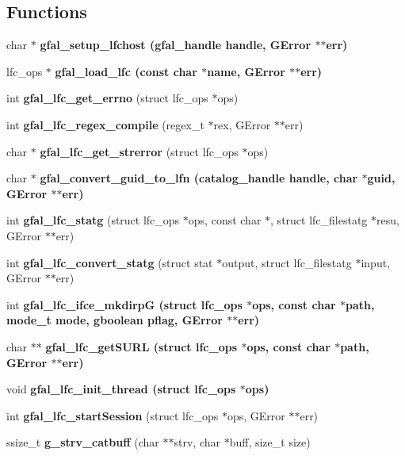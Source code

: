 \subsection*{Functions}
\begin{CompactItemize}
\item 
char $\ast$ \bf{gfal\_\-setup\_\-lfchost} (gfal\_\-handle handle, GError $\ast$$\ast$err)
\item 
lfc\_\-ops $\ast$ \bf{gfal\_\-load\_\-lfc} (const char $\ast$name, GError $\ast$$\ast$err)
\item 
int \textbf{gfal\_\-lfc\_\-get\_\-errno} (struct lfc\_\-ops $\ast$ops)\label{lfc__ifce__ng_8h_caa53981228e722b2175cfd7b4ca051c}

\item 
int \textbf{gfal\_\-lfc\_\-regex\_\-compile} (regex\_\-t $\ast$rex, GError $\ast$$\ast$err)\label{lfc__ifce__ng_8h_4ecadc4bf36b4b23af7beb949f6190be}

\item 
char $\ast$ \textbf{gfal\_\-lfc\_\-get\_\-strerror} (struct lfc\_\-ops $\ast$ops)\label{lfc__ifce__ng_8h_58172b62403dfd7a7b742548f074cd44}

\item 
char $\ast$ \bf{gfal\_\-convert\_\-guid\_\-to\_\-lfn} (catalog\_\-handle handle, char $\ast$guid, GError $\ast$$\ast$err)
\item 
int \textbf{gfal\_\-lfc\_\-statg} (struct lfc\_\-ops $\ast$ops, const char $\ast$, struct lfc\_\-filestatg $\ast$resu, GError $\ast$$\ast$err)\label{lfc__ifce__ng_8h_afccde3c16147263025698f5481635cf}

\item 
int \textbf{gfal\_\-lfc\_\-convert\_\-statg} (struct stat $\ast$output, struct lfc\_\-filestatg $\ast$input, GError $\ast$$\ast$err)\label{lfc__ifce__ng_8h_79cceda78f871c9bd8568a636dd31206}

\item 
int \bf{gfal\_\-lfc\_\-ifce\_\-mkdirp\-G} (struct lfc\_\-ops $\ast$ops, const char $\ast$path, mode\_\-t mode, gboolean pflag, GError $\ast$$\ast$err)
\item 
char $\ast$$\ast$ \bf{gfal\_\-lfc\_\-get\-SURL} (struct lfc\_\-ops $\ast$ops, const char $\ast$path, GError $\ast$$\ast$err)
\item 
void \bf{gfal\_\-lfc\_\-init\_\-thread} (struct lfc\_\-ops $\ast$ops)
\item 
int \textbf{gfal\_\-lfc\_\-start\-Session} (struct lfc\_\-ops $\ast$ops, GError $\ast$$\ast$err)\label{lfc__ifce__ng_8h_191824f5c6bfee67e81f0c495e9bb778}

\item 
ssize\_\-t \textbf{g\_\-strv\_\-catbuff} (char $\ast$$\ast$strv, char $\ast$buff, size\_\-t size)\label{lfc__ifce__ng_8h_bc04cd8d7342170700f02f6297fc4105}

\end{CompactItemize}


